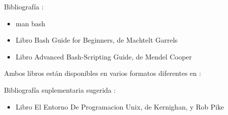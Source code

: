 \documentclass{beamer}
\begin{document}
\begin{frame}
Bibliografía : 
\begin{itemize}
\item man bash
\item Libro Bash Guide for Beginners, de Machtelt Garrels 
\item Libro Advanced Bash-Scripting Guide, de Mendel Cooper
\end{itemize}

Ambos libros están disponibles en varios formatos diferentes en :

Bibliografía suplementaria sugerida : 
\begin{itemize}
\item Libro El Entorno De Programacion Unix, de Kernighan, y Rob Pike
\end{itemize}

\end{frame}
\end{document}
